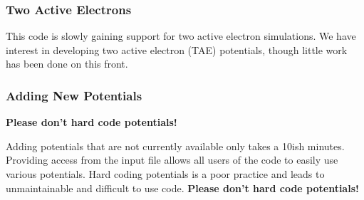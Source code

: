 \documentclass{article}
\begin{document}
\subsubsection{Two Active Electrons} %
\label{ssub:two_active_electrons}
This code is slowly gaining support for two active electron simulations. We have interest in developing two active electron (TAE) potentials, though little work has been done on this front.

\subsubsection{Adding New Potentials} %
\label{ssub:adding_new_potentials}
\textbf{Please don't hard code potentials!}

Adding potentials that are not currently available only takes a 10ish minutes. Providing access from the input file allows all users of the code to easily use various potentials. Hard coding potentials is a poor practice and leads to unmaintainable and difficult to use code. \textbf{Please don't hard code potentials!}
\end{document}
